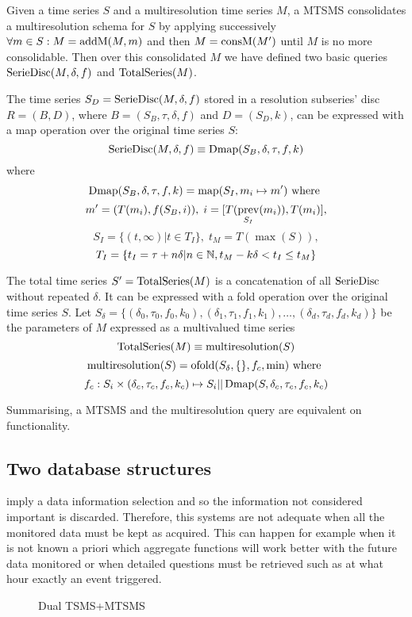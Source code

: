 Given a time series $S$ and a multiresolution time series $M$, a MTSMS
consolidates a multiresolution schema for $S$ by applying successively
$\forall m \in S: M=\operatorname{addM}(M,m)$ and then $M=\operatorname{consM}(M')$ until $M$ is
no more consolidable. Then over this consolidated $M$ we have defined
two basic queries $\operatorname{SerieDisc}(M,\delta,f)$ and $\operatorname{TotalSeries}(M)$.

The time series $S_D=\operatorname{SerieDisc}(M,\delta,f)$ stored in a resolution
subseries' disc $R=(B,D)$, where $B=(S_B,\tau,\delta,f)$ and
$D=(S_D,k)$, can be expressed with a map operation over the original
time series $S$:
\[
\operatorname{SerieDisc}(M,\delta,f) \equiv \operatorname{Dmap}(S_B,\delta,\tau,f,k)
\]
where
\[
\operatorname{Dmap}(S_B,\delta,\tau,f,k) = \operatorname*{map}(S_I, m_i\mapsto m') \text{ where }
\]
\[
 m' = (T(m_i), f(S_B, i)),\;  i = [T(\operatorname*{prev}_{S_I}(m_i)),T(m_i)],
\]
\[
 S_I = \{ (t,\infty) | t\in T_I  \},\;  t_M = T(\max(S)),
\]
\[
T_I = \{ t_I = \tau+n\delta | n\in\mathbb{N}, t_M - k\delta < t_I \leq t_M \}
\]


The total time series $S'=\operatorname{TotalSeries}(M)$ is a concatenation of all
$\operatorname{SerieDisc}$ without repeated $\delta$. It can be expressed with a
fold operation over the original time series $S$. Let $S_\delta = \{
(\delta_0,\tau_0,f_0,k_0), (\delta_1,\tau_1,f_1,k_1), \ldots,
(\delta_d,\tau_d,f_d,k_d)\}$ be the parameters of $M$ expressed as a
multivalued time series
\[
\operatorname{TotalSeries}(M) \equiv \operatorname{multiresolution}(S)
\]
\[
\operatorname{multiresolution}(S) = \operatorname*{ofold}(S_\delta,\{\},f_c,\min) \text{ where }
\]
\[
f_c: S_i \times (\delta_c,\tau_c,f_c,k_c) \mapsto S_i ||
\operatorname{Dmap}(S,\delta_c,\tau_c,f_c,k_c)
\]



Summarising, a MTSMS and the multiresolution query are equivalent on
functionality.



\subsection{Two database structures}

 imply a data information selection and so the information
not considered important is discarded.  Therefore, this systems are
not adequate when all the monitored data must be kept as
acquired. This can happen for example when it is not known a priori
which aggregate functions will work better with the future data
monitored or when detailed questions must be retrieved such as at what
hour exactly an event triggered. 

\begin{figure}
  \centering
  
  \caption{Dual TSMS+MTSMS}
  \label{fig:model:mtsms-tsms}
\end{figure}

